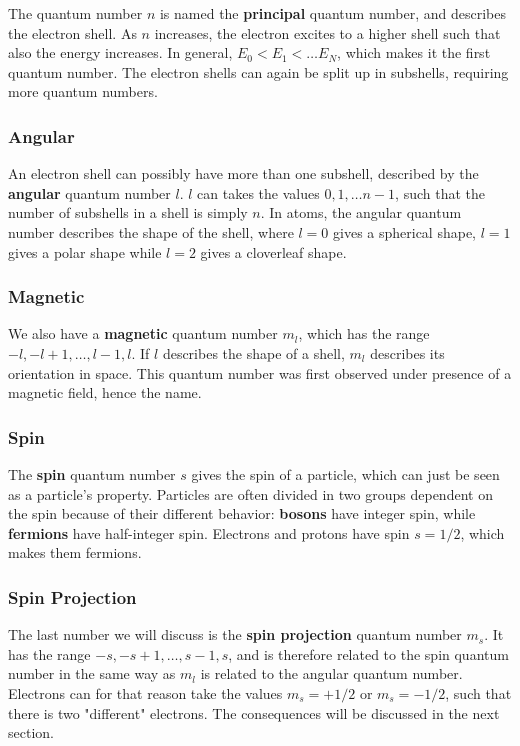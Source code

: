 The quantum number $n$ is named the \textbf{principal} quantum number, and describes the electron shell. As $n$ increases, the electron excites to a higher shell such that also the energy increases. In general, $E_0<E_1<\hdots E_N$, which makes it the first quantum number. The electron shells can again be split up in subshells, requiring more quantum numbers.

\subsubsection*{Angular}
An electron shell can possibly have more than one subshell, described by the \textbf{angular} quantum number $l$. $l$ can takes the values $0,1,\hdots n-1$, such that the number of subshells in a shell is simply $n$. In atoms, the angular quantum number describes the shape of the shell, where $l=0$ gives a spherical shape, $l=1$ gives a polar shape while $l=2$ gives a cloverleaf shape. 

\subsubsection*{Magnetic}
We also have a \textbf{magnetic} quantum number $m_l$, which has the range $-l,-l+1,\hdots,l-1,l$. If $l$ describes the shape of a shell, $m_l$ describes its orientation in space. This quantum number was first observed under presence of a magnetic field, hence the name.

\subsubsection*{Spin}
The \textbf{spin} quantum number $s$ gives the spin of a particle, which can just be seen as a particle's property. Particles are often divided in two groups dependent on the spin because of their different behavior: \textbf{bosons} have integer spin, while \textbf{fermions} have half-integer spin. Electrons and protons have spin $s=1/2$, which makes them fermions.

\subsubsection*{Spin Projection}
The last number we will discuss is the \textbf{spin projection} quantum number $m_s$. It has the range $-s,-s+1,\hdots,s-1,s$, and is therefore related to the spin quantum number in the same way as $m_l$ is related to the angular quantum number. Electrons can for that reason take the values $m_s=+1/2$ or $m_s=-1/2$, such that there is two "different" electrons. The consequences will be discussed in the next section.

